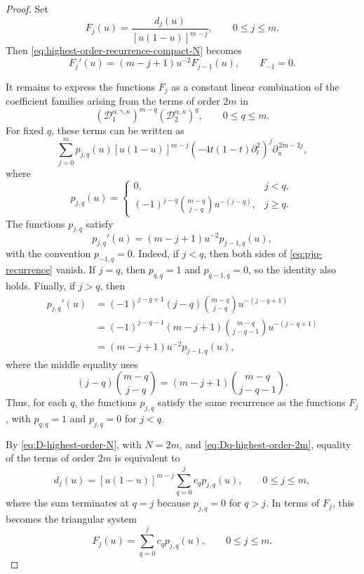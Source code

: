 \documentclass[10pt,a4paper]{amsart}
\begin{document}
\begin{proof}
Set
\[
F_j(u)
=
\frac{d_j(u)}{[u(1-u)]^{m-j}},
\qquad 0\leq j\leq m.
\]
Then \eqref{eq:highest-order-recurrence-compact-N} becomes
\begin{equation}\label{eq:Fj_recurrence}
F_j'(u)
=
(m-j+1)u^{-2}F_{j-1}(u),
\qquad F_{-1}=0.
\end{equation}

It remains to express the functions \(F_j\) as a constant linear
combination of the coefficient families arising from the terms of order
\(2m\) in
\[
\left(\mathcal D_1^{\alpha,\gamma,\kappa}\right)^{m-q}
\left(\mathcal D_2^{\alpha,\kappa}\right)^q,
\qquad 0\leq q\leq m.
\]
For fixed \(q\), these terms can be written as
\begin{equation}\label{eq:Dq-highest-order-2m}
\sum_{j=0}^{m}
p_{j,q}(u)
[u(1-u)]^{m-j}
\left(-4t(1-t)\partial_t^2\right)^j
\partial_u^{\,2m-2j},
\end{equation}
where
\[
p_{j,q}(u)
=
\begin{cases}
0, & j<q,\\[4pt]
(-1)^{j-q}
\binom{m-q}{j-q}
u^{-(j-q)}, & j\ge q.
\end{cases}
\]
The functions \(p_{j,q}\) satisfy
\begin{equation}\label{eq:pjq-recurrence}
p_{j,q}'(u)
=
(m-j+1)u^{-2}p_{j-1,q}(u),
\end{equation}
with the convention \(p_{-1,q}=0\). Indeed, if \(j<q\), then both sides
of \eqref{eq:pjq-recurrence} vanish. If \(j=q\), then \(p_{q,q}=1\) and
\(p_{q-1,q}=0\), so the identity also holds. Finally, if \(j>q\), then
\[
\begin{aligned}
p_{j,q}'(u)
&=
(-1)^{j-q+1}(j-q)
\binom{m-q}{j-q}
u^{-(j-q+1)}
\\
&=
(-1)^{j-q-1}(m-j+1)
\binom{m-q}{j-q-1}
u^{-(j-q+1)}
\\
&=
(m-j+1)u^{-2}p_{j-1,q}(u),
\end{aligned}
\]
where the middle equality uses
\[
(j-q)\binom{m-q}{j-q}
=
(m-j+1)\binom{m-q}{j-q-1}.
\]
Thus, for each \(q\), the functions \(p_{j,q}\) satisfy the same
recurrence as the functions \(F_j\), with \(p_{q,q}=1\) and
\(p_{j,q}=0\) for \(j<q\).

By \eqref{eq:D-highest-order-N}, with \(N=2m\), and
\eqref{eq:Dq-highest-order-2m}, equality of the terms of order \(2m\) is
equivalent to
\[
d_j(u)
=
[u(1-u)]^{m-j}
\sum_{q=0}^{j}c_qp_{j,q}(u),
\qquad 0\le j\le m,
\]
where the sum terminates at \(q=j\) because \(p_{j,q}=0\) for \(q>j\).
In terms of \(F_j\), this becomes the triangular system
\[
F_j(u)
=
\sum_{q=0}^{j}c_qp_{j,q}(u),
\qquad 0\le j\le m.
\]


\end{proof}
\end{document}
